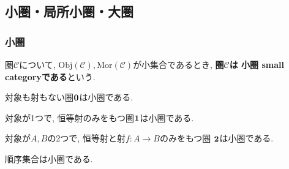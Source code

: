 \begin{comment}
\subsection{情報隠蔽された対象の探究に圏論が提供する方法論}
オブジェクト指向プログラミングでは,「知らせる必要のない情報は隠蔽しておくほうが安全である」という{\bf 情報隠蔽}の考え方が重要視される.
これに対して, 圏論は, 対象がもつ情報が隠蔽されている状況下で, 射のみから対象について探究するという方法論を提供する.
\begin{example}
どのような要素をもつかわからない集合$A$について写像$f:A\rightarrow A$が定義されていて$f\circ f\circ f$が恒等写像になるとする.
このとき$A$が3つの要素$a_1,a_2,a_3$をもつと仮定することができ,
\[
f(a_1)=a_2, f(a_2)=a_3, 
f(a_3)=a_1
\]
というように, これらの要素が写像$f$によって回転していると考えることができる.
\end{example}
\end{comment}
\subsection{小圏・局所小圏・大圏}
\subsubsection{小圏}
\begin{Def}
圏$\mathscr{C}$について, $\mathrm{Obj}(\mathscr{C}),\mathrm{Mor}(\mathscr{C})$が小集合であるとき,
{\bf 圏$\mathscr{C}$は
小圏 small categoryである}という.
\end{Def}

\begin{Prop}\label{Prop:small category zero}
対象も射もない圏${\bf 0}$は小圏である.
\end{Prop}

\begin{Prop}\label{Prop:small category one}
対象が1つで, 恒等射のみをもつ圏${\bf 1}$は小圏である.
\end{Prop}

\begin{Prop}\label{Prop:small category two}
対象が$A,B$の2つで, 
恒等射と射$f:A\rightarrow B$のみをもつ圏
${\bf 2}$は小圏である.
\end{Prop}

\begin{Prop}\label{Prop:small category ordered set}
順序集合は小圏である.
\end{Prop}

